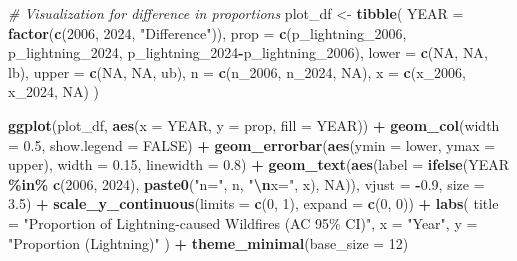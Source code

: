 \documentclass[
]{article}
\newenvironment{Shaded}{\begin{snugshade}}{\end{snugshade}}
\newcommand{\AttributeTok}[1]{\textcolor[rgb]{0.13,0.29,0.53}{#1}}
\newcommand{\CommentTok}[1]{\textcolor[rgb]{0.56,0.35,0.01}{\textit{#1}}}
\newcommand{\ConstantTok}[1]{\textcolor[rgb]{0.56,0.35,0.01}{#1}}
\newcommand{\DecValTok}[1]{\textcolor[rgb]{0.00,0.00,0.81}{#1}}
\newcommand{\FloatTok}[1]{\textcolor[rgb]{0.00,0.00,0.81}{#1}}
\newcommand{\FunctionTok}[1]{\textcolor[rgb]{0.13,0.29,0.53}{\textbf{#1}}}
\newcommand{\NormalTok}[1]{#1}
\newcommand{\OtherTok}[1]{\textcolor[rgb]{0.56,0.35,0.01}{#1}}
\newcommand{\SpecialCharTok}[1]{\textcolor[rgb]{0.81,0.36,0.00}{\textbf{#1}}}
\newcommand{\StringTok}[1]{\textcolor[rgb]{0.31,0.60,0.02}{#1}}
\begin{document}
\begin{Shaded}
\begin{Highlighting}[]
\CommentTok{\# Visualization for difference in proportions}
\NormalTok{plot\_df }\OtherTok{\textless{}{-}} \FunctionTok{tibble}\NormalTok{(}
  \AttributeTok{YEAR  =} \FunctionTok{factor}\NormalTok{(}\FunctionTok{c}\NormalTok{(}\DecValTok{2006}\NormalTok{, }\DecValTok{2024}\NormalTok{, }\StringTok{"Difference"}\NormalTok{)),}
  \AttributeTok{prop  =} \FunctionTok{c}\NormalTok{(p\_lightning\_2006, p\_lightning\_2024, p\_lightning\_2024}\SpecialCharTok{{-}}\NormalTok{p\_lightning\_2006),}
  \AttributeTok{lower =} \FunctionTok{c}\NormalTok{(}\ConstantTok{NA}\NormalTok{, }\ConstantTok{NA}\NormalTok{, lb),}
  \AttributeTok{upper =} \FunctionTok{c}\NormalTok{(}\ConstantTok{NA}\NormalTok{, }\ConstantTok{NA}\NormalTok{, ub),}
  \AttributeTok{n     =} \FunctionTok{c}\NormalTok{(n\_2006, n\_2024, }\ConstantTok{NA}\NormalTok{),}
  \AttributeTok{x     =} \FunctionTok{c}\NormalTok{(x\_2006, x\_2024, }\ConstantTok{NA}\NormalTok{)}
\NormalTok{)}

\FunctionTok{ggplot}\NormalTok{(plot\_df, }\FunctionTok{aes}\NormalTok{(}\AttributeTok{x =}\NormalTok{ YEAR, }\AttributeTok{y =}\NormalTok{ prop, }\AttributeTok{fill =}\NormalTok{ YEAR)) }\SpecialCharTok{+}
  \FunctionTok{geom\_col}\NormalTok{(}\AttributeTok{width =} \FloatTok{0.5}\NormalTok{, }\AttributeTok{show.legend =} \ConstantTok{FALSE}\NormalTok{) }\SpecialCharTok{+}
  \FunctionTok{geom\_errorbar}\NormalTok{(}\FunctionTok{aes}\NormalTok{(}\AttributeTok{ymin =}\NormalTok{ lower, }\AttributeTok{ymax =}\NormalTok{ upper), }\AttributeTok{width =} \FloatTok{0.15}\NormalTok{, }\AttributeTok{linewidth =} \FloatTok{0.8}\NormalTok{) }\SpecialCharTok{+}
  \FunctionTok{geom\_text}\NormalTok{(}\FunctionTok{aes}\NormalTok{(}\AttributeTok{label =} \FunctionTok{ifelse}\NormalTok{(YEAR }\SpecialCharTok{\%in\%} \FunctionTok{c}\NormalTok{(}\DecValTok{2006}\NormalTok{, }\DecValTok{2024}\NormalTok{), }\FunctionTok{paste0}\NormalTok{(}\StringTok{"n="}\NormalTok{, n, }\StringTok{"}\SpecialCharTok{\textbackslash{}n}\StringTok{x="}\NormalTok{, x), }\ConstantTok{NA}\NormalTok{)),}
            \AttributeTok{vjust =} \SpecialCharTok{{-}}\FloatTok{0.9}\NormalTok{, }\AttributeTok{size =} \FloatTok{3.5}\NormalTok{) }\SpecialCharTok{+}
  \FunctionTok{scale\_y\_continuous}\NormalTok{(}\AttributeTok{limits =} \FunctionTok{c}\NormalTok{(}\DecValTok{0}\NormalTok{, }\DecValTok{1}\NormalTok{), }\AttributeTok{expand =} \FunctionTok{c}\NormalTok{(}\DecValTok{0}\NormalTok{, }\DecValTok{0}\NormalTok{)) }\SpecialCharTok{+}
  \FunctionTok{labs}\NormalTok{(}
    \AttributeTok{title =} \StringTok{"Proportion of Lightning{-}caused Wildfires (AC 95\% CI)"}\NormalTok{,}
    \AttributeTok{x =} \StringTok{"Year"}\NormalTok{,}
    \AttributeTok{y =} \StringTok{"Proportion (Lightning)"}
\NormalTok{  ) }\SpecialCharTok{+}
  \FunctionTok{theme\_minimal}\NormalTok{(}\AttributeTok{base\_size =} \DecValTok{12}\NormalTok{)}
\end{Highlighting}
\end{Shaded}
\end{document}
